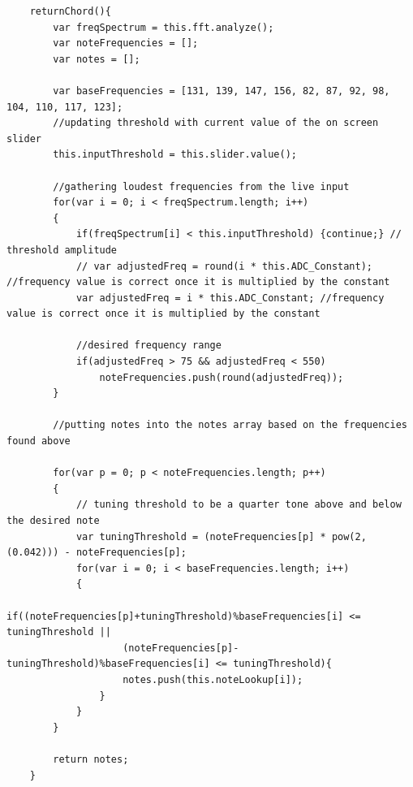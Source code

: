 \documentclass[12pt,a4paper]{article}
\begin{document}
\newpage
			\begin{lstlisting}
	returnChord(){
        var freqSpectrum = this.fft.analyze();
        var noteFrequencies = [];
        var notes = [];

        var baseFrequencies = [131, 139, 147, 156, 82, 87, 92, 98, 104, 110, 117, 123];
        //updating threshold with current value of the on screen slider
        this.inputThreshold = this.slider.value();

        //gathering loudest frequencies from the live input
        for(var i = 0; i < freqSpectrum.length; i++)
        {
            if(freqSpectrum[i] < this.inputThreshold) {continue;} // threshold amplitude
            // var adjustedFreq = round(i * this.ADC_Constant); //frequency value is correct once it is multiplied by the constant 
            var adjustedFreq = i * this.ADC_Constant; //frequency value is correct once it is multiplied by the constant 

            //desired frequency range
            if(adjustedFreq > 75 && adjustedFreq < 550)
                noteFrequencies.push(round(adjustedFreq)); 
        }

        //putting notes into the notes array based on the frequencies found above
        
        for(var p = 0; p < noteFrequencies.length; p++)
        {
            // tuning threshold to be a quarter tone above and below the desired note
            var tuningThreshold = (noteFrequencies[p] * pow(2,(0.042))) - noteFrequencies[p];
            for(var i = 0; i < baseFrequencies.length; i++)
            {
                if((noteFrequencies[p]+tuningThreshold)%baseFrequencies[i] <= tuningThreshold ||
                    (noteFrequencies[p]-tuningThreshold)%baseFrequencies[i] <= tuningThreshold){
                    notes.push(this.noteLookup[i]);
                }
            }
        }

        return notes;
    }
			\end{lstlisting}
\end{document}

